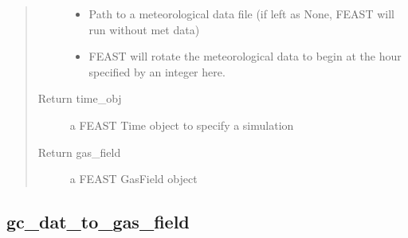 \documentclass[letterpaper,10pt,english]{sphinxmanual}
\begin{document}
\begin{fulllineitems}
\begin{quote}
\begin{description}
\begin{itemize}
\item {} 
 \textendash{} Path to a meteorological data file (if left as None, FEAST will run without met data)

\item {} 
 \textendash{} FEAST will rotate the meteorological data to begin at the hour specified by an integer here.

\end{itemize}

\item[{Return time\_obj}] \leavevmode
a FEAST Time object to specify a simulation

\item[{Return gas\_field}] \leavevmode
a FEAST GasField object

\end{description}\end{quote}

\end{fulllineitems}



\subsection{gc\_dat\_to\_gas\_field}
\label{\detokenize{index:gc-dat-to-gas-field}}
\end{document}
